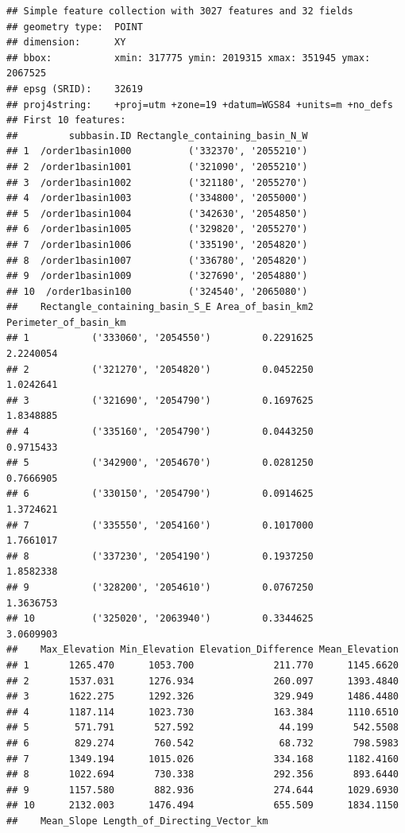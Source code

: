 \documentclass[11pt,]{article}
\begin{document}
\begin{verbatim}
## Simple feature collection with 3027 features and 32 fields
## geometry type:  POINT
## dimension:      XY
## bbox:           xmin: 317775 ymin: 2019315 xmax: 351945 ymax: 2067525
## epsg (SRID):    32619
## proj4string:    +proj=utm +zone=19 +datum=WGS84 +units=m +no_defs
## First 10 features:
##         subbasin.ID Rectangle_containing_basin_N_W
## 1  /order1basin1000          ('332370', '2055210')
## 2  /order1basin1001          ('321090', '2055210')
## 3  /order1basin1002          ('321180', '2055270')
## 4  /order1basin1003          ('334800', '2055000')
## 5  /order1basin1004          ('342630', '2054850')
## 6  /order1basin1005          ('329820', '2055270')
## 7  /order1basin1006          ('335190', '2054820')
## 8  /order1basin1007          ('336780', '2054820')
## 9  /order1basin1009          ('327690', '2054880')
## 10  /order1basin100          ('324540', '2065080')
##    Rectangle_containing_basin_S_E Area_of_basin_km2 Perimeter_of_basin_km
## 1           ('333060', '2054550')         0.2291625             2.2240054
## 2           ('321270', '2054820')         0.0452250             1.0242641
## 3           ('321690', '2054790')         0.1697625             1.8348885
## 4           ('335160', '2054790')         0.0443250             0.9715433
## 5           ('342900', '2054670')         0.0281250             0.7666905
## 6           ('330150', '2054790')         0.0914625             1.3724621
## 7           ('335550', '2054160')         0.1017000             1.7661017
## 8           ('337230', '2054190')         0.1937250             1.8582338
## 9           ('328200', '2054610')         0.0767250             1.3636753
## 10          ('325020', '2063940')         0.3344625             3.0609903
##    Max_Elevation Min_Elevation Elevation_Difference Mean_Elevation
## 1       1265.470      1053.700              211.770      1145.6620
## 2       1537.031      1276.934              260.097      1393.4840
## 3       1622.275      1292.326              329.949      1486.4480
## 4       1187.114      1023.730              163.384      1110.6510
## 5        571.791       527.592               44.199       542.5508
## 6        829.274       760.542               68.732       798.5983
## 7       1349.194      1015.026              334.168      1182.4160
## 8       1022.694       730.338              292.356       893.6440
## 9       1157.580       882.936              274.644      1029.6930
## 10      2132.003      1476.494              655.509      1834.1150
##    Mean_Slope Length_of_Directing_Vector_km

\end{verbatim}
\end{document}
